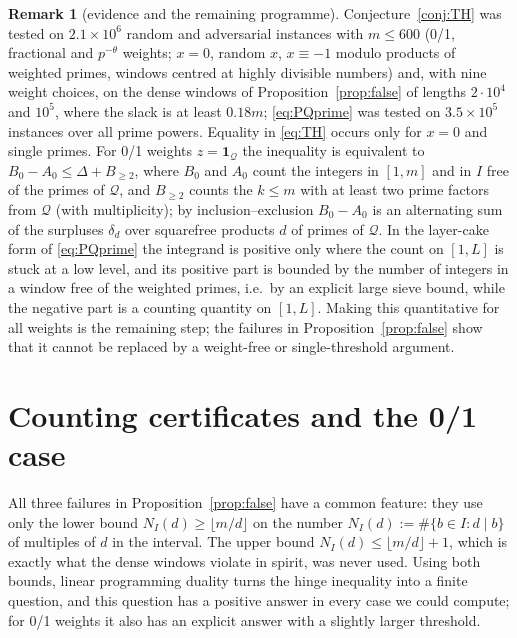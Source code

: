 \documentclass[11pt]{article}
\theoremstyle{definition}
\newtheorem{remark}[theorem]{Remark}
\begin{document}
\begin{remark}[evidence and the remaining programme]
Conjecture~\ref{conj:TH} was tested on $2.1\times10^6$ random and adversarial instances with $m\le600$ (0/1,
fractional and $p^{-\theta}$ weights; $x=0$, random $x$, $x\equiv-1$ modulo products of weighted primes, windows centred
at highly divisible numbers) and, with nine weight choices, on the dense windows of Proposition~\ref{prop:false} of
lengths $2\cdot10^4$ and $10^5$, where the slack is at least $0.18m$; \eqref{eq:PQprime} was tested on $3.5\times10^5$
instances over all prime powers. Equality in \eqref{eq:TH} occurs only for $x=0$ and single primes. For 0/1 weights
$z=\mathbf 1_{\mathcal Q}$ the inequality is equivalent to $B_0-A_0\le\Delta+B_{\ge2}$, where $B_0$ and $A_0$ count the
integers in $[1,m]$ and in $I$ free of the primes of $\mathcal Q$, and $B_{\ge2}$ counts the $k\le m$ with at least two
prime factors from $\mathcal Q$ (with multiplicity); by inclusion--exclusion $B_0-A_0$ is an alternating sum of the
surpluses $\delta_d$ over squarefree products $d$ of primes of $\mathcal Q$. In the layer-cake form of
\eqref{eq:PQprime} the integrand is positive only where the count on $[1,L]$ is stuck at a low level, and its
positive part is bounded by the number of integers in a window free of the weighted primes, i.e.\ by an explicit large
sieve bound, while the negative part is a counting quantity on $[1,L]$. Making this quantitative for all weights is
the remaining step; the failures in Proposition~\ref{prop:false} show that it cannot be replaced by a weight-free
or single-threshold argument.
\end{remark}

\section{Counting certificates and the 0/1 case}\label{sec:counting}

All three failures in Proposition~\ref{prop:false} have a common feature: they use only the lower bound
$N_I(d)\ge\lfloor m/d\rfloor$ on the number $N_I(d):=\#\{b\in I:d\mid b\}$ of multiples of $d$ in the interval. The
upper bound $N_I(d)\le\lfloor m/d\rfloor+1$, which is exactly what the dense windows violate in spirit, was never
used. Using both bounds, linear programming duality turns the hinge inequality into a finite question, and this
question has a positive answer in every case we could compute; for 0/1 weights it also has an explicit answer with a
slightly larger threshold.
\end{document}
